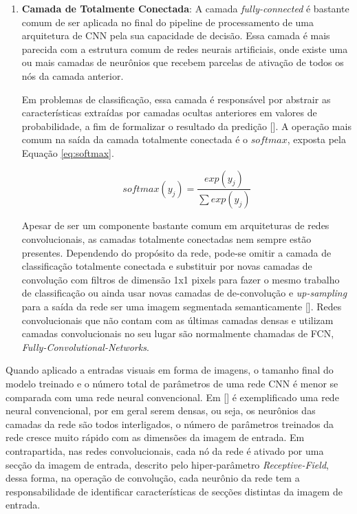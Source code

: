 \begin{enumerate}
    \item \textbf{Camada de Totalmente Conectada}:
            A camada \textit{fully-connected} é bastante comum de ser aplicada no final do pipeline de processamento de uma arquitetura de CNN pela sua capacidade de decisão. Essa camada é mais parecida com a estrutura comum de redes neurais artificiais, onde existe uma ou mais camadas de neurônios que recebem parcelas de ativação de todos os nós da camada anterior.
            
            Em problemas de classificação, essa camada é responsável por abstrair as características extraídas por camadas ocultas anteriores em valores de probabilidade, a fim de formalizar o resultado da predição []. A operação mais comum na saída da camada totalmente conectada é o $softmax$, exposta pela Equação \ref{eq:softmax}.
            
            \begin{equation}
                \label{eq:softmax}
                softmax(y_j) = \frac{exp(y_j)}{\sum exp(y_j)}
            \end{equation}
            
            Apesar de ser um componente bastante comum em arquiteturas de redes convolucionais, as camadas totalmente conectadas nem sempre estão presentes. Dependendo do propósito da rede, pode-se omitir a camada de classificação totalmente conectada e substituir por novas camadas de convolução com filtros de dimensão 1x1 pixels para fazer o mesmo trabalho de classificação ou ainda usar novas camadas de de-convolução e \textit{up-sampling} para a saída da rede ser uma imagem segmentada semanticamente []. Redes convolucionais que não contam com as últimas camadas densas e utilizam camadas convolucionais no seu lugar são normalmente chamadas de FCN, \textit{Fully-Convolutional-Networks}.
\end{enumerate}

Quando aplicado a entradas visuais em forma de imagens, o tamanho final do modelo treinado e o número total de parâmetros de uma rede CNN é menor se comparada com uma rede neural convencional. Em [] é exemplificado uma rede neural convencional, por em geral serem densas, ou seja, os neurônios das camadas da rede são todos interligados, o número de parâmetros treinados da rede cresce muito rápido com as dimensões da imagem de entrada. Em contrapartida, nas redes convolucionais, cada nó da rede é ativado por uma secção da imagem de entrada, descrito pelo hiper-parâmetro \textit{Receptive-Field}, dessa forma, na operação de convolução, cada neurônio da rede tem a responsabilidade de identificar características de secções distintas da imagem de entrada.

